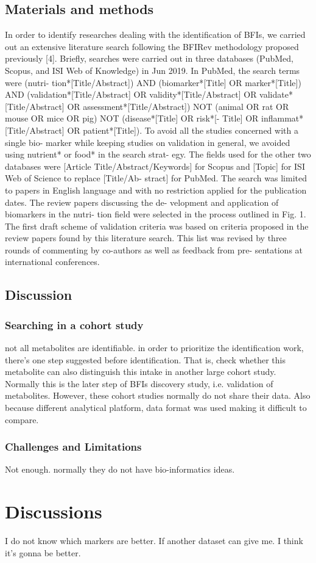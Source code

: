 \documentclass[]{report}
\begin{document}
\section{Materials and methods}
In order to identify researches dealing with the identification of BFIs, we carried out an extensive literature search following the BFIRev methodology proposed previously [4].
 Briefly, searches were carried out in three databases (PubMed, Scopus, and ISI Web of Knowledge) in Jun 2019. In PubMed, the search terms were (nutri- tion*[Title/Abstract]) AND (biomarker*[Title] OR marker*[Title]) AND (validation*[Title/Abstract] OR validity*[Title/Abstract] OR validate*[Title/Abstract] OR assessment*[Title/Abstract]) NOT (animal OR rat OR mouse OR mice OR pig) NOT (disease*[Title] OR risk*[- Title] OR inflammat*[Title/Abstract] OR patient*[Title]). To avoid all the studies concerned with a single bio- marker while keeping studies on validation in general, we avoided using nutrient* or food* in the search strat- egy. The fields used for the other two databases were [Article Title/Abstract/Keywords] for Scopus and [Topic] for ISI Web of Science to replace [Title/Ab- stract] for PubMed. The search was limited to papers in English language and with no restriction applied for the publication dates. The review papers discussing the de- velopment and application of biomarkers in the nutri- tion field were selected in the process outlined in Fig. 1. The first draft scheme of validation criteria was based on criteria proposed in the review papers found by this literature search. This list was revised by three rounds of commenting by co-authors as well as feedback from pre- sentations at international conferences.


\section{Discussion}
\subsection{Searching in a cohort study}
not all metabolites are identifiable. in order to prioritize the identification work, there's one step suggested before identification. That is, check whether this metabolite can also distinguish this intake in another large cohort study. Normally this is the later step of BFIs discovery study, i.e. validation of metabolites. 
However, these cohort studies normally do not share their data. Also because different analytical platform, data format was used making it difficult to compare.

\subsection{Challenges and Limitations}
Not enough.
normally they do not have bio-informatics ideas.


\chapter{Discussions}
I do not know which markers are better. If another dataset can give me. I think it's gonna be better.
\end{document}
